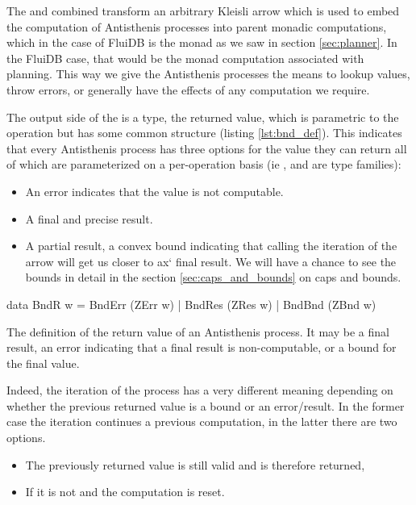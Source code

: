 The  and  combined transform an
arbitrary Kleisli arrow which is used to embed the computation of
Antisthenis processes into parent monadic computations, which in the
case of FluiDB is the  monad as we saw in section
\ref{sec:planner}. In the FluiDB case, that would be the monad
computation associated with planning. This way we give the
Antisthenis processes the means to lookup values, throw errors, or
generally have the effects of any computation we require.

The output side of the  is a  type, the
returned value, which is parametric to the operation but has some
common structure (listing \ref{lst:bnd_def}). This indicates that every
Antisthenis process has three options for the value they can return
all of which are parameterized on a per-operation basis (ie
,  and  are type families):

\begin{itemize}
\item An error indicates that the value is not computable.
\item A final and precise result.
\item A partial result, a convex bound indicating that calling the
  iteration of the arrow will get us closer to ax` final result. We will
  have a chance to see the bounds in detail in the section
  \ref{sec:caps_and_bounds} on caps and bounds.
\end{itemize}


\begin{code}
\begin{haskellcode}
data BndR w
  = BndErr (ZErr w)
  | BndRes (ZRes w)
  | BndBnd (ZBnd w)
\end{haskellcode}
  \caption{\label{lst:bnd_def}The definition of the return value of an
    Antisthenis process. It may be a final result, an error indicating
    that a final result is non-computable, or a bound for the final
    value.}
\end{code}

Indeed, the iteration of the process has a very different meaning
depending on whether the previous returned value is a bound or an
error/result. In the former case the iteration continues a previous
computation, in the latter there are two options.

\begin{itemize}
\item The previously returned value is still valid and is therefore
  returned,
\item If it is not and the computation is reset.
\end{itemize}

